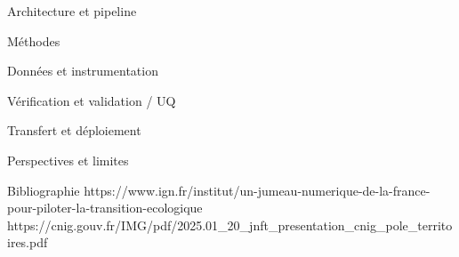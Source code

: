 \documentclass{beamer}
\begin{document}
\begin{frame}{Architecture et pipeline}
\end{frame}


\begin{frame}{Méthodes}
    
\end{frame}


\begin{frame}{Données et instrumentation}
\end{frame}


\begin{frame}{Vérification et validation / UQ}
    
\end{frame}


\begin{frame}{Transfert et déploiement}
    
\end{frame}


\begin{frame}{Perspectives et limites}
    
\end{frame}


\begin{frame}{Bibliographie}
    https://www.ign.fr/institut/un-jumeau-numerique-de-la-france-pour-piloter-la-transition-ecologique
    https://cnig.gouv.fr/IMG/pdf/2025.01_20_jnft_presentation_cnig_pole_territoires.pdf
\end{frame}
\end{document}
